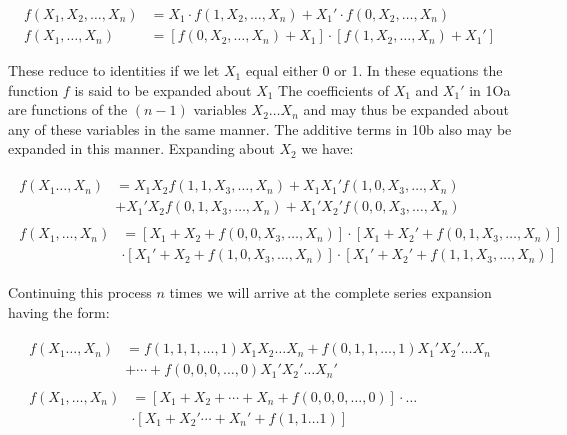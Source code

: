 \documentclass[12pt,oneside,letterpaper]{scrbook}
\begin{document}
		\begin{subequations}
			\begin{align}
				f(X_1, X_2, \ldots, X_n) &= X_1 \cdot f(1, X_2, \ldots, X_n) + X_1' \cdot f(0, X_2, \ldots, X_n)\\
				f(X_1, \ldots, X_n) &= [f(0, X_2, \ldots, X_n) + X_1] \cdot [f(1, X_2, \ldots, X_n) + X_1']
			\end{align}
		\end{subequations}

		These reduce to identities if we let $X_1$ equal either 0 or 1. In these equations the function $f$ is said to be expanded about $X_1$ The coefficients of $X_1$ and $X_1'$ in 1Oa are functions of the $(n - 1)$ variables $X_2 \ldots X_n$ and may thus be expanded about any of these variables in the same manner. The additive terms in 10b also may be expanded in this manner. Expanding about $X_2$ we have:

		\begin{subequations}
			\begin{align}
				\begin{split}
					f(X_1 \ldots, X_n) &= X_1 X_2 f(1, 1, X_3, \ldots, X_n) + X_1 X_1' f(1,0, X_3, \ldots, X_n)\\
					&+ X_1'X_2f(0,1,X_3,\ldots,X_n) + X_1' X_2' f(0,0,X_3,\ldots,X_n)
				\end{split}\\
				\begin{split}
					f(X_1, \ldots, X_n) &= [X_1 + X_2 + f(0,0,X_3,\ldots,X_n)]\cdot [X_1 + X_2' + f(0,1,X_3,\ldots,X_n)]\\
					&\cdot [X_1' + X_2 + f(1,0,X_3,\ldots,X_n)]\cdot [X_1' + X_2' + f(1,1,X_3,\ldots,X_n)]	
				\end{split}
			\end{align}
		\end{subequations}

		Continuing this process $n$ times we will arrive at the complete series expansion having the form:

		\begin{subequations}
			\begin{align}
				\begin{split}
					f(X_1 \ldots, X_n) &= f(1, 1, 1, \ldots, 1) X_1 X_2 \ldots X_n +  f(0,1,1, \ldots, 1) X_1' X_2' \ldots X_n \\
					&+ \cdots + f(0,0,0,\ldots,0)X_1'X_2'\ldots X_n'
				\end{split}\\
				\begin{split}
					f(X_1, \ldots, X_n) &= [X_1 + X_2 + \cdots + X_n + f(0,0,0,\ldots,0)]\cdot \ldots \\
					&\cdot[X_1 + X_2' \cdots + X_n' + f(1,1 \ldots 1)]	
				\end{split}
			\end{align}
		\end{subequations}
\end{document}
